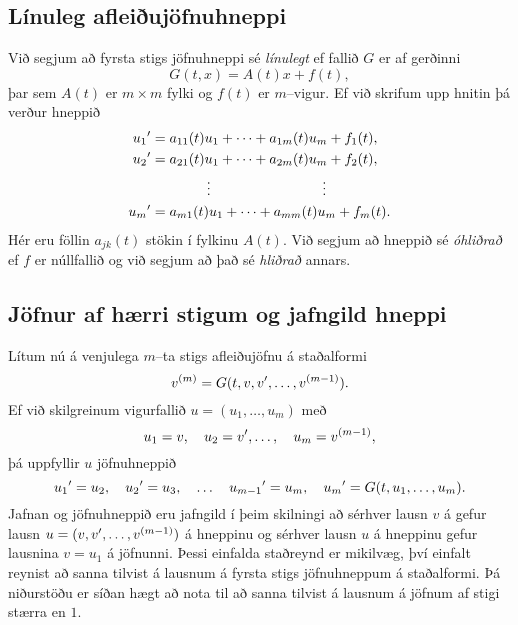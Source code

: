 \subsection*{Línuleg afleiðujöfnuhneppi}

Við segjum að fyrsta stigs jöfnuhneppi sé {\it
línulegt} ef fallið
$G$ er af gerðinni 
 $$G(t,x)=A(t)x+f(t),
 $$
þar sem $A(t)$ er $m\times m$ fylki og $f(t)$ er $m$--vigur.
Ef við skrifum upp hnitin þá verður hneppið
\begin{align*}
u_1{\sp{\prime}}&=a_{11}(t)u_1+\cdots+a_{1m}(t)u_m+f_1(t),\\
u_2{\sp{\prime}}&=a_{21}(t)u_1+\cdots+a_{2m}(t)u_m+f_2(t),\\
&\qquad \qquad \vdots\qquad \qquad \qquad \qquad \vdots\\
u_m{\sp{\prime}}&=a_{m1}(t)u_1+\cdots+a_{mm}(t)u_m+f_m(t).
\end{align*}
Hér eru föllin $a_{jk}(t)$ stökin í fylkinu $A(t)$.
Við segjum að hneppið sé {\it
óhliðrað}
ef $f$ er núllfallið og við segjum  að það sé {\it
hliðrað}  annars.


\subsection*{Jöfnur af hærri stigum og jafngild hneppi}

Lítum nú á venjulega $m$--ta stigs afleiðujöfnu á staðalformi
\begin{equation*}v\sp{(m)}=G(t,v,v{\sp{\prime}},\dots,v\sp{(m-1)}).\label{1.3.2}
\end{equation*}
Ef við skilgreinum vigurfallið $u=(u_1,\dots,u_m)$ með
$$u_1=v, \quad u_2=v{\sp{\prime}},\dots, \quad  u_m=v\sp{(m-1)},
$$ þá uppfyllir $u$
jöfnuhneppið
 \begin{equation*}
u_1{\sp{\prime}} = u_2, \quad
u_2{\sp{\prime}} = u_3, \quad\dots \quad
u_{m-1}{\sp{\prime}} = u_m, \quad
u_m{\sp{\prime}} =G(t, u_1,\dots,u_m). 
\label{1.3.3}
 \end{equation*}
Jafnan og jöfnuhneppið eru jafngild í þeim skilningi
að sérhver lausn $v$ á  gefur lausn
$u=(v,v{\sp{\prime}},\dots,v\sp{(m-1)})$ á hneppinu og sérhver lausn $u$ á
hneppinu  gefur lausnina $v=u_1$ á jöfnunni.  Þessi einfalda staðreynd
er mikilvæg, því einfalt reynist  að sanna tilvist á lausnum á fyrsta
stigs jöfnuhneppum á staðalformi.  Þá niðurstöðu er síðan hægt að nota
til að sanna tilvist á lausnum á jöfnum af stigi stærra en $1$.  

